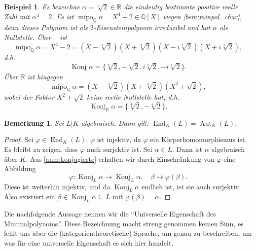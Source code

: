 \documentclass[a4paper, twoside, 11pt, ngerman]{report}
\newcommand{\QQ}{\mathds Q}
\newcommand{\RR}{\mathds R}
\DeclareMathOperator{\alg}{alg}
\DeclareMathOperator{\Aut}{Aut}
\DeclareMathOperator{\End}{End}
\DeclareMathOperator{\Konj}{Konj}
\DeclareMathOperator{\mipo}{mipo}
\DeclareMathOperator{\QQalg}{\QQ^{\alg}}
\theoremstyle{definistyle}
\newtheorem{bem}[satz]{Bemerkung}
\newtheorem{bsp}[satz]{Beispiel}
\theoremstyle{remark}
\begin{document}
\begin{bsp}\label{bsp:konjugierte}
Es bezeichne $\alpha=\sqrt[4]{2}\in\RR$ die eindeutig bestimmte positive reelle Zahl mit $\alpha^4=2$.
Es ist $\mipo_\QQ\alpha=X^4-2\in\QQ[X]$ wegen \ref{bem:minpol_char}, denn dieses Polynom ist als $2$-Eisensteinpolynom irreduzibel und hat $\alpha$ als Nullstelle. Über $\QQalg$ ist
\[
\mipo_\QQ\alpha=X^4-2=(X - \sqrt[4]{2})(X + \sqrt[4]{2})(X - i\sqrt[4]{2})(X + i\sqrt[4]{2}),
\]
d.h.
\[
\Konj_{\QQalg}\alpha=\{\sqrt[4]{2},-\sqrt[4]{2},i\sqrt[4]{2},-i\sqrt[4]{2}\}.
\]
Über $\RR$ ist hingegen
\[
\mipo_\QQ\alpha = (X - \sqrt[4]{2})(X + \sqrt[4]{2})(X^2+\sqrt{2}),
\]
wobei der Faktor $X^2+\sqrt{2}$ keine reelle Nullstelle hat, d.h.
\[
\Konj_{\RR}\alpha=\{\sqrt[4]{2},-\sqrt[4]{2}\}.
\]
\end{bsp}

\begin{bem}\label{bem:end_ist_aut}
Sei $L|K$ algebraisch. Dann gilt: $\End_K(L) = \Aut_K(L)$.
\end{bem}

\begin{proof}
Sei $\varphi \in \End_K(L)$. $\varphi$ ist injektiv, da $\varphi$ ein Körperhomomorphismus ist. Es bleibt zu zeigen, dass $\varphi$ auch surjektiv ist. Sei $\alpha \in L$. Dann ist $\alpha$ algebraisch über $K$. Aus \ref{anm:konjugierte} erhalten wir durch Einschränkung von $\varphi$ eine Abbildung
\[
\varphi\colon\Konj_L\alpha \to\Konj_L\alpha, \quad \beta\mapsto\varphi(\beta).
\]
Diese ist weiterhin injektiv, und da $\Konj_L\alpha$ endlich ist, ist sie auch surjektiv.
Also existiert ein $\beta \in \Konj_L\alpha\subseteq L$ mit $\varphi(\beta) = \alpha$.
\end{proof}

Die nachfolgende Aussage nennen wir die "`Universelle Eigenschaft des Minimalpolynoms"'.
Diese Bezeichnung macht streng genommen keinen Sinn, es fehlt uns aber die (kategorientheoretische) Sprache, um genau zu beschreiben, um was für eine universelle Eigenschaft es sich hier handelt.
\end{document}
